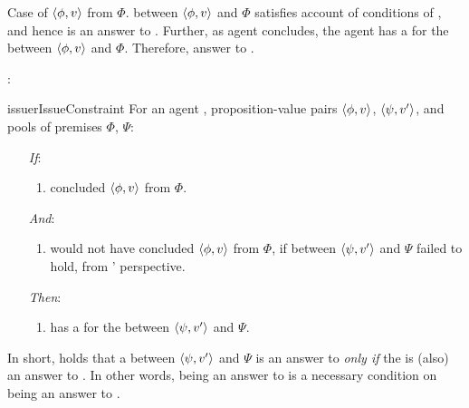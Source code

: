 \begin{note}
  Case of \(\langle \phi, v \rangle\) from \(\Phi\).
  \ros{} between \(\langle \phi, v \rangle\) and \(\Phi\) satisfies account of conditions of \qWhyVnP{}, and hence is an answer to \qWhyVnP{}.
  Further, as agent concludes, the agent has a  for the \ros{} between \(\langle \phi, v \rangle\) and \(\Phi\).
  Therefore, answer to \qHowV{}.
\end{note}

\begin{note}
  \issueConstraint{}:

  \begin{restatable}[\issueConstraint{}]{issue}{rIssueConstraint}
    \label{issue:has-witnessed}
    For an agent \vAgent{}, proposition-value pairs \(\langle \phi, v \rangle\), \(\langle \psi, v' \rangle\), and pools of premises \(\Phi\), \(\Psi\):

    \begin{enumerate}
    \item[\emph{If}:]
      \begin{enumerate}[label=\alph*., ref=(\alph*)]
      \item \vAgent{} concluded \(\langle \phi, v \rangle\) from \(\Phi\).
      \end{enumerate}
    \item[\emph{And}:]
      \begin{enumerate}[label=\alph*., ref=(\alph*), resume]
      \item
        \vAgent{} would not have concluded \(\langle \phi, v \rangle\) from \(\Phi\), if \support{} between \(\langle \psi, v' \rangle\) and \(\Psi\) failed to hold, from \vAgent{}' perspective.
      \end{enumerate}
    \item[\emph{Then}:]
      \begin{enumerate}[label=\alph*., ref=(\alph*), resume]
      \item
        \vAgent{} has a  for the \ros{} between \(\langle \psi, v' \rangle\) and \(\Psi\).
      \end{enumerate}
    \end{enumerate}
    \vspace{-\baselineskip}
  \end{restatable}

  In short, \issueConstraint{} holds that a \ros{} between \(\langle \psi, v' \rangle\) and \(\Psi\) is an answer to \qWhyV{} \emph{only if} the \ros{} is (also) an answer to \qHowV{}.
  In other words, being an answer to \qHowV{} is a necessary condition on being an answer to \qWhyV{}.
\end{note}

